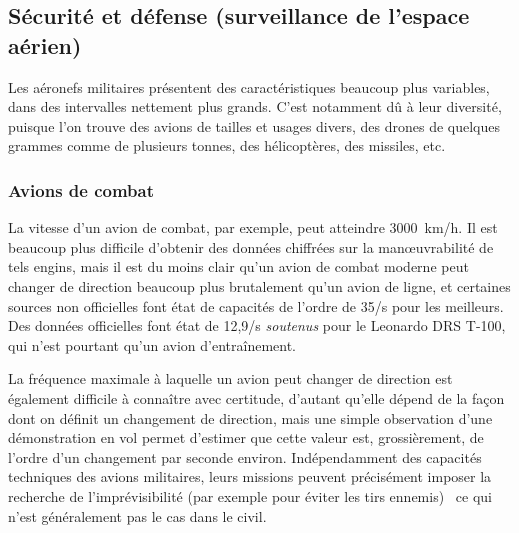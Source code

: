 	\FloatBarrier \subsection{Sécurité et défense (surveillance de l'espace aérien)}
	Les aéronefs militaires présentent des caractéristiques beaucoup plus variables, dans des intervalles nettement plus grands. C'est notamment dû à leur diversité, puisque l'on trouve des avions de tailles et usages divers, des drones de quelques grammes comme de plusieurs tonnes, des hélicoptères, des missiles, etc.
	
	\subsubsection{Avions de combat}
	La vitesse d'un avion de combat, par exemple, peut atteindre 3000~km/h\footnotemark. Il est beaucoup plus difficile d'obtenir des données chiffrées sur la manœuvrabilité de tels engins, mais il est du moins clair qu'un avion de combat moderne peut changer de direction beaucoup plus brutalement qu'un avion de ligne, et certaines sources non officielles font état de capacités de l'ordre de 35\textdegree{}/s pour les meilleurs\footnotemark. Des données officielles font état de 12,9\textdegree{}/s \emph{soutenus} pour le Leonardo DRS T-100, qui n'est pourtant qu'un avion d'entraînement\footnotemark.
	
	\addtocounter{footnote}{-2}
	\addtocounter{footnote}{1}
	\addtocounter{footnote}{1}
	
	La fréquence maximale à laquelle un avion peut changer de direction est également difficile à connaître avec certitude, d'autant qu'elle dépend de la façon dont on définit un changement de direction, mais une simple observation d'une démonstration en vol permet d'estimer que cette valeur est, grossièrement, de l'ordre d'un changement par seconde environ\footnotemark. Indépendamment des capacités techniques des avions militaires, leurs missions peuvent précisément imposer la recherche de l'imprévisibilité (par exemple pour éviter les tirs ennemis)~\cite{shaw1985fighter} ce qui n'est généralement pas le cas dans le civil.
	
